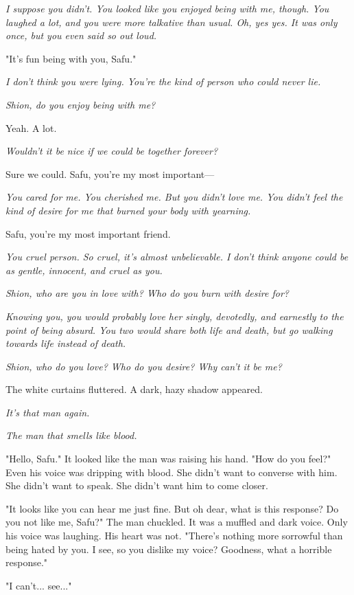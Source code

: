 \emph{I suppose you didn't. You looked like you enjoyed being with me, though.
You laughed a lot, and you were more talkative than usual. Oh, yes yes.
It was only once, but you even said so out loud.}

"It's fun being with you, Safu."

\emph{I don't think you were lying. You're the kind of person who could never
lie.}

\emph{Shion, do you enjoy being with me?}

Yeah. A lot.

\emph{Wouldn't it be nice if we could be together forever?}

Sure we could. Safu, you're my most important---

\emph{You cared for me. You cherished me. But you didn't love me. You didn't
feel the kind of desire for me that burned your body with yearning.}

Safu, you're my most important friend.

\emph{You cruel person. So cruel, it's almost unbelievable. I don't think
anyone could be as gentle, innocent, and cruel as you.}

\emph{Shion, who are you in love with? Who do you burn with desire for?}

\emph{Knowing you, you would probably love her singly, devotedly, and
earnestly to the point of being absurd. You two would share both life
and death, but go walking towards life instead of death.}

\emph{Shion, who do you love? Who do you desire? Why can't it be me?}

The white curtains fluttered. A dark, hazy shadow appeared.

\emph{It's that man again.}

\emph{The man that smells like blood.}

"Hello, Safu." It looked like the man was raising his hand. "How do you
feel?" Even his voice was dripping with blood. She didn't want to
converse with him. She didn't want to speak. She didn't want him to come
closer.

"It looks like you can hear me just fine. But oh dear, what is this
response? Do you not like me, Safu?" The man chuckled. It was a muffled
and dark voice. Only his voice was laughing. His heart was not. "There's
nothing more sorrowful than being hated by you. I see, so you dislike my
voice? Goodness, what a horrible response."

"I can't... see..."

